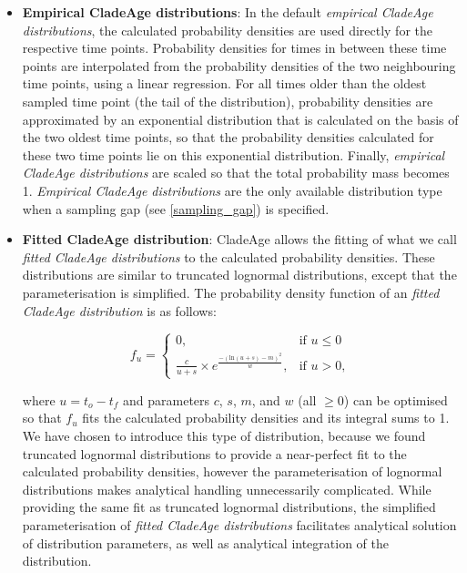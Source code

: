 \documentclass{article}
\begin{document}
\begin{itemize}
\item
{\bf Empirical CladeAge distributions}: In the default \emph{empirical CladeAge distributions}, the calculated probability densities are used directly for the respective time points. Probability densities for times in between these time points are interpolated from the probability densities of the two neighbouring time points, using a linear regression. For all times older than the oldest sampled time point (the tail of the distribution), probability densities are approximated by an exponential distribution that is calculated on the basis of the two oldest time points, so that the probability densities calculated for these two time points lie on this exponential distribution. Finally, \emph{empirical CladeAge distributions} are scaled so that the total probability mass becomes 1. \emph{Empirical CladeAge distributions} are the only available distribution type when a sampling gap (see \ref{sampling_gap}) is specified.

\item
{\bf Fitted CladeAge distribution}: CladeAge allows the fitting of what we call \emph{fitted CladeAge distributions} to the calculated probability densities. These distributions are similar to truncated lognormal distributions, except that the parameterisation is simplified. The probability density function of an \emph{fitted CladeAge distribution} is as follows:

\begin{equation*}
f_{u} =
\begin{cases}
0, & \mbox{if } u \leq 0 \\
\frac{c}{u + s} \times e^{\frac{-(\mathrm{ln}(u+s) - m)^2}{w}}, & \mbox{if } u > 0,
\end{cases}
\end{equation*}

where $u = t_o - t_f$ and parameters $c$, $s$, $m$, and $w$ (all $\geq 0$) can be optimised so that $f_{u}$ fits the calculated probability densities and its integral sums to 1. We have chosen to introduce this type of distribution, because we found truncated lognormal distributions to provide a near-perfect fit to the calculated probability densities, however the parameterisation of lognormal distributions makes analytical handling unnecessarily complicated. While providing the same fit as truncated lognormal distributions, the simplified parameterisation of \emph{fitted CladeAge distributions} facilitates analytical solution of distribution parameters, as well as analytical integration of the distribution.


\end{itemize}
\end{document}
